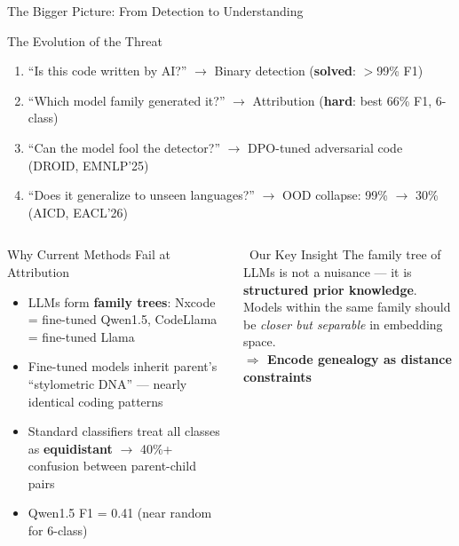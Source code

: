 \documentclass[aspectratio=169, 10pt]{beamer}
\begin{document}
\begin{frame}{The Bigger Picture: From Detection to Understanding}
\vspace{-0.1cm}

\begin{block}{The Evolution of the Threat}
\small
\begin{enumerate}\setlength\itemsep{4pt}
    \item[\textbf{2023}] ``Is this code written by AI?'' $\to$ Binary detection (\textbf{solved}: $>$99\% F1)
    \item[\textbf{2024}] ``Which model family generated it?'' $\to$ Attribution (\textbf{hard}: best 66\% F1, 6-class)
    \item[\textbf{2025}] ``Can the model fool the detector?'' $\to$ DPO-tuned adversarial code (DROID, EMNLP'25)
    \item[\textbf{2026}] ``Does it generalize to unseen languages?'' $\to$ OOD collapse: 99\% $\to$ 30\% (AICD, EACL'26)
\end{enumerate}
\end{block}

\vspace{0.1cm}
\begin{columns}[T]
\begin{alertblock}{Why Current Methods Fail at Attribution}
\small
\begin{itemize}\setlength\itemsep{2pt}
    \item LLMs form \textbf{family trees}: Nxcode = fine-tuned Qwen1.5, CodeLlama = fine-tuned Llama
    \item Fine-tuned models inherit parent's ``stylometric DNA'' --- nearly identical coding patterns
    \item Standard classifiers treat all classes as \textbf{equidistant} $\to$ 40\%+ confusion between parent-child pairs
    \item Qwen1.5 F1 = 0.41 (near random for 6-class)
\end{itemize}
\end{alertblock}

\begin{exampleblock}{\faLightbulb\ Our Key Insight}
\small
The family tree of LLMs is not a nuisance --- it is \textbf{structured prior knowledge}.\\[6pt]
Models within the same family should be \emph{closer but separable} in embedding space.\\[6pt]
\textbf{$\Rightarrow$ Encode genealogy as distance constraints}
\end{exampleblock}
\end{columns}
\end{frame}
\end{document}
